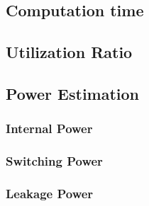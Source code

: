 \subsection{Computation time}
\subsection{Utilization Ratio}
\subsection{Power Estimation}
\subsubsection{Internal Power}
\subsubsection{Switching Power}
\subsubsection{Leakage Power}
